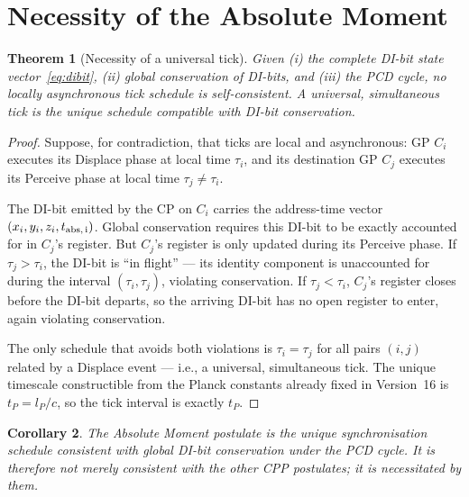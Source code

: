 \documentclass[12pt]{article}
\newtheorem{theorem}{Theorem}[section]
\newtheorem{corollary}[theorem]{Corollary}
\begin{document}
\section{Necessity of the Absolute Moment}
\label{sec:necessity}

\begin{theorem}[Necessity of a universal tick]
\label{thm:necessity}
Given (i) the complete DI-bit state vector~\eqref{eq:dibit}, (ii) global
conservation of DI-bits, and (iii) the PCD cycle, no locally asynchronous
tick schedule is self-consistent.  A universal, simultaneous tick is the
unique schedule compatible with DI-bit conservation.
\end{theorem}

\begin{proof}
Suppose, for contradiction, that ticks are local and asynchronous: GP
$C_i$ executes its Displace phase at local time $\tau_i$, and its destination
GP $C_j$ executes its Perceive phase at local time $\tau_j \ne \tau_i$.

The DI-bit emitted by the CP on $C_i$ carries the address-time vector
$(x_i, y_i, z_i, t_{\rm abs,\,i})$.  Global conservation requires this
DI-bit to be exactly accounted for in $C_j$'s register.  But $C_j$'s
register is only updated during its Perceive phase.  If $\tau_j > \tau_i$,
the DI-bit is ``in flight'' --- its identity component is unaccounted for
during the interval $(\tau_i, \tau_j)$, violating conservation.  If
$\tau_j < \tau_i$, $C_j$'s register closes before the DI-bit departs, so
the arriving DI-bit has no open register to enter, again violating
conservation.

The only schedule that avoids both violations is $\tau_i = \tau_j$ for all
pairs $(i, j)$ related by a Displace event --- i.e., a universal, simultaneous
tick.  The unique timescale constructible from the Planck constants already
fixed in Version~16 is $t_P = l_P/c$, so the tick interval is exactly $t_P$.
\end{proof}

\begin{corollary}
The Absolute Moment postulate is the unique synchronisation schedule
consistent with global DI-bit conservation under the PCD cycle.  It is
therefore not merely consistent with the other CPP postulates; it is
necessitated by them.
\end{corollary}
\end{document}
